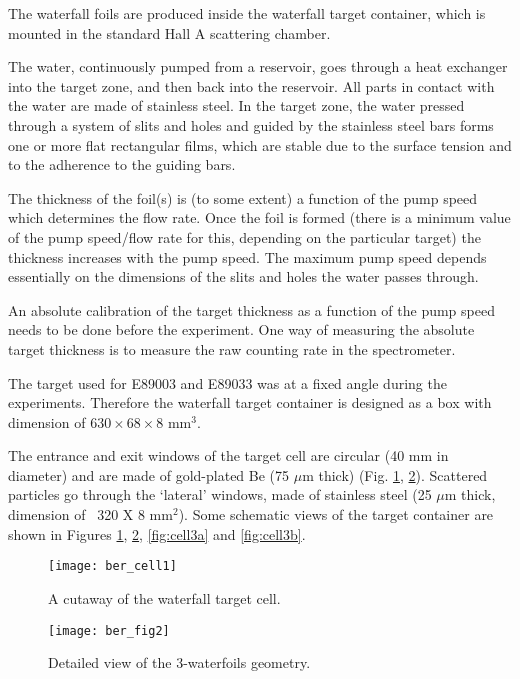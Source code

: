The waterfall foils are produced inside the waterfall target container,
which is mounted in the standard Hall A scattering chamber. 

The water, continuously pumped from a reservoir, goes through a heat exchanger
into the target zone, and then back into the reservoir. All parts in contact 
with the water are made of stainless steel. In the target zone, the water pressed through a system of slits and holes and guided by the stainless steel bars
forms one or more flat rectangular films,
which are stable due to the surface tension and to the adherence to the guiding bars.

The thickness of the foil(s) is (to some extent) a function of the 
pump speed which determines the flow rate.  
Once the foil is formed (there is a 
minimum value of the pump speed/flow rate for this, depending on the 
particular target) the thickness increases with the pump speed. The 
maximum pump speed depends essentially on the dimensions of the
slits and holes the water passes through. 

An absolute calibration of the target thickness as a function of the
 pump speed needs to be done before the experiment.
One way of measuring the absolute target thickness 
is to  measure the raw counting rate in the spectrometer.

The target used for E89003 and E89033 was at a fixed angle during the 
experiments. Therefore the waterfall target container is designed as a box
with dimension of $630\times68\times8$ mm$^3$. 

The entrance and exit windows of the target cell are 
circular (40 mm in diameter) and are made of gold-plated Be (75 $\mu$m thick)
(Fig. \ref{fig:cell1}, \ref{fig:cell2}).
Scattered particles go through the `lateral' windows, made of 
stainless steel (25 $\mu$m thick, dimension of ~320 X 8 mm$^2$).
Some schematic views of the target container are shown 
in Figures \ref{fig:cell1},
\ref{fig:cell2}, \ref{fig:cell3a} and \ref{fig:cell3b}. 

\begin{figure}[htp]
\begin{center}
\texttt{[image: ber\_cell1]}
\caption[Waterfall Target: Cutaway of Target Cell]{A cutaway of the waterfall target cell.}
\label{fig:cell1}
\end{center}
\end{figure}

\begin{figure}[htp]
\begin{center}
\texttt{[image: ber\_fig2]}
\caption[Waterfall Target: Three Foil Geometry]{Detailed view of the 3-waterfoils geometry.}
\label{fig:cell2}
\end{center}
\end{figure}

